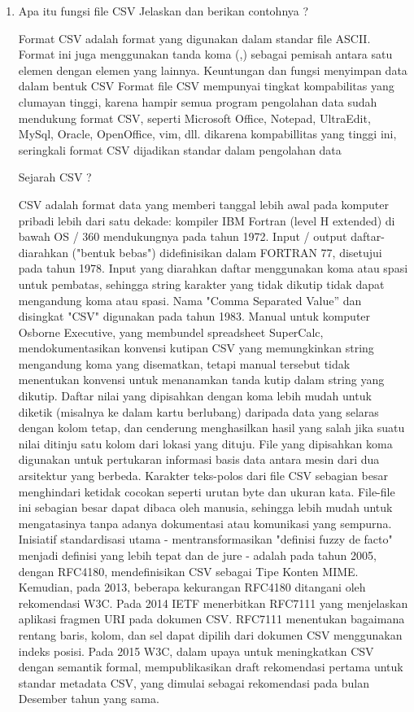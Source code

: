 \begin{enumerate}
\begin{enumerate}
\item Apa itu fungsi file CSV Jelaskan dan berikan contohnya ?

Format CSV adalah format yang digunakan dalam standar file ASCII. Format ini juga menggunakan tanda koma (,) sebagai pemisah antara satu elemen dengan elemen yang lainnya.
Keuntungan dan fungsi menyimpan data dalam bentuk CSV
Format file CSV mempunyai  tingkat kompabilitas yang clumayan tinggi, karena hampir semua program pengolahan data sudah mendukung format CSV, seperti Microsoft Office, Notepad, UltraEdit, MySql, Oracle, OpenOffice, vim, dll. dikarena kompabillitas yang tinggi ini, seringkali format CSV dijadikan standar dalam pengolahan data

Sejarah CSV ?

CSV adalah format data yang memberi tanggal lebih awal pada komputer pribadi lebih dari satu dekade: kompiler IBM Fortran (level H extended) di bawah OS / 360 mendukungnya pada tahun 1972. Input / output daftar-diarahkan ("bentuk bebas") didefinisikan dalam FORTRAN 77, disetujui pada tahun 1978. Input yang diarahkan daftar menggunakan koma atau spasi untuk pembatas, sehingga string karakter yang tidak dikutip tidak dapat mengandung koma atau spasi. 
Nama "Comma Separated Value” dan disingkat "CSV" digunakan pada tahun 1983.  Manual untuk komputer Osborne Executive, yang membundel spreadsheet SuperCalc, mendokumentasikan konvensi kutipan CSV yang memungkinkan string mengandung koma yang disematkan, tetapi manual tersebut tidak menentukan konvensi untuk menanamkan tanda kutip dalam string yang dikutip.
Daftar nilai yang dipisahkan dengan koma lebih mudah untuk diketik (misalnya ke dalam kartu berlubang) daripada data yang selaras dengan kolom tetap, dan cenderung menghasilkan hasil yang salah jika suatu nilai ditinju satu kolom dari lokasi yang dituju.
File yang dipisahkan koma digunakan untuk pertukaran informasi basis data antara mesin dari dua arsitektur yang berbeda. Karakter teks-polos dari file CSV sebagian besar menghindari ketidak cocokan seperti urutan byte dan ukuran kata. File-file ini sebagian besar dapat dibaca oleh manusia, sehingga lebih mudah untuk mengatasinya tanpa adanya dokumentasi atau komunikasi yang sempurna.
Inisiatif standardisasi utama - mentransformasikan "definisi fuzzy de facto" menjadi definisi yang lebih tepat dan de jure - adalah pada tahun 2005, dengan RFC4180, mendefinisikan CSV sebagai Tipe Konten MIME. Kemudian, pada 2013, beberapa kekurangan RFC4180 ditangani oleh rekomendasi W3C. 
Pada 2014 IETF menerbitkan RFC7111 yang menjelaskan aplikasi fragmen URI pada dokumen CSV. RFC7111 menentukan bagaimana rentang baris, kolom, dan sel dapat dipilih dari dokumen CSV menggunakan indeks posisi.
Pada 2015 W3C, dalam upaya untuk meningkatkan CSV dengan semantik formal, mempublikasikan draft rekomendasi pertama untuk standar metadata CSV, yang dimulai sebagai rekomendasi pada bulan Desember tahun yang sama.


\end{enumerate}
\end{enumerate}
